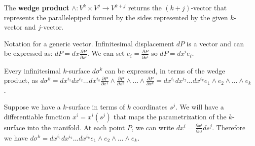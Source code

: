 \documentclass[11pt,letterpaper,fleqn]{memoir}
\begin{document}
\begin{defn}
	The \textbf{wedge product} $\wedge : V^k\times V^j \to V^{k+j}$ returns the $(k+j)$-vector that represents the parallelepiped formed by the sides represented by the given $k$-vector and $j$-vector. 
\end{defn}


\begin{remark}
	Notation for a generic vector. Infinitesimal displacement $dP$ is a vector and can be expressed as: $dP = dx \frac{\partial P}{\partial x^i}$. We can set $e_i = \frac{\partial P}{\partial x^i}$ so $dP = dx^i e_i$.
	
	Every infinitesimal $k$-surface $d\sigma^k$ can be expressed, in terms of the wedge product, as $d\sigma^k= dx^{i_1}dx^{i_2}...dx^{i_k}\frac{\partial P}{\partial x^1} \wedge \frac{\partial P}{\partial x^2} \wedge ... \wedge \frac{\partial P}{\partial x^k} = dx^{i_1}dx^{i_2}...dx^{i_k} e_1 \wedge e_2 \wedge ... \wedge e_k$.
	
	Suppose we have a $k$-surface in terms of $k$ coordinates $s^j$. We will have a differentiable function $x^i = x^i(s^j)$ that maps the parametrization of the $k$-surface into the manifold. At each point $P$, we can write $dx^i = \frac{\partial x^i}{\partial s^j} ds^j$. Therefore we have $d\sigma^k = dx^{i_1}dx^{i_2}...dx^{i_k} e_1 \wedge e_2 \wedge ... \wedge e_k$.
	

\end{remark}
\end{document}
